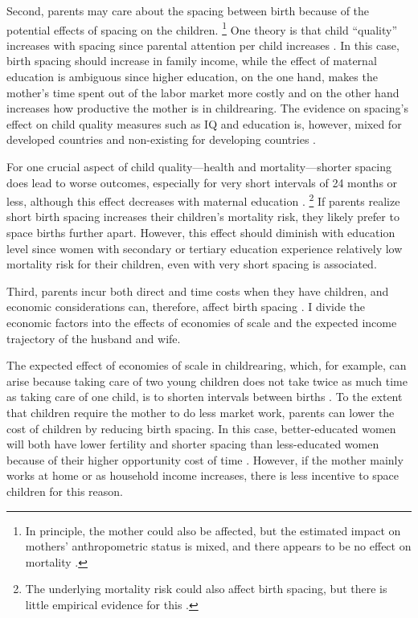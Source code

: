 \documentclass[12pt,letterpaper]{article}
\begin{document}
Second, parents may care about the spacing between birth because of the 
potential effects of spacing on the children.%
\footnote{
In principle, the mother could also be affected, but the estimated impact on 
mothers' anthropometric status is mixed, and there appears to be no 
effect on mortality 
\citep{Ronsmans1998,Menken2003,Dewey2007,Conde-Agudelo2012}.
}
One theory is that child ``quality'' increases with spacing 
since parental attention per child increases
\citep{Zajonc1975,Zajonc1976,Razin1980}.
In this case, birth spacing should increase in family income, while the 
effect of maternal education is ambiguous since higher education, on the 
one hand, makes the mother's time spent out of the labor market more 
costly and on the other hand increases how productive the mother is 
in childrearing.
The evidence on spacing's effect on child quality measures such as IQ 
and education is, however, mixed for developed countries and non-existing 
for developing countries
\citep{Powell1993,Pettersson-Lidbom2009,Buckles2012,Barclay2017}.

For one crucial aspect of child quality---health and mortality---shorter spacing 
does lead to worse outcomes, especially for very short intervals of 24 months 
or less, although this effect decreases with maternal education
\citep{Whitworth2002,Conde-Agudelo2006,Conde-Agudelo2012,Molitoris2019}.%
\footnote{
The underlying mortality risk could also affect birth spacing, but
there is little empirical evidence for this 
\citep{Newman1983,Newman1988,Bhalotra2008}.
}
If parents realize short birth spacing increases their children's mortality risk, 
they likely prefer to space births further apart.
However, this effect should diminish with education level since women with 
secondary or tertiary education experience relatively low mortality risk for 
their children, even with very short spacing is associated.


Third, parents incur both direct and time costs when they have children, 
and economic considerations can, therefore, affect birth spacing 
\citep{Hotz1997,schultz97}.
I divide the economic factors into the effects of economies of scale and
the expected income trajectory of the husband and wife.

The expected effect of economies of scale in childrearing, which, for example, 
can arise because taking care of two young children does not take twice as much 
time as taking care of one child, is to shorten intervals between births
\citep{Vijverberg1982}.
To the extent that children require the mother to do less market work, parents 
can lower the cost of children by reducing birth spacing.
In this case, better-educated women will both have lower fertility and shorter
spacing than less-educated women because of their higher opportunity cost of time 
\citep{Ross1974,Newman1984}.
However, if the mother mainly works at home or as household income increases, there 
is less incentive to space children for this reason.
\end{document}
